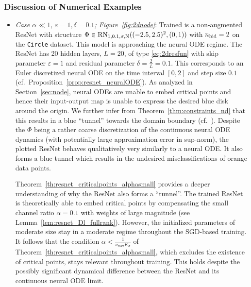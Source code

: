 \documentclass[10pt]{article}
\theoremstyle{definition}
\numberwithin{equation}{section}
\newcommand{\eps}{\varepsilon}
\newcommand*{\nhid}{n_\textup{hid}}
\begin{document}
\subsubsection{Discussion of Numerical Examples}
\begin{itemize}
    \item \emph{Case $\alpha \ll 1$, $\eps = 1, \delta = 0.1$; Figure~\ref{fig:2dnode}}: Trained is a non-augmented ResNet with structure $\Phi \in \textup{RN}_{1,0.1,\sigma, \textup{N}}((-2.5,2.5)^2, (0,1))$ with $\nhid = 2$ on the \texttt{Circle} dataset. This model is approaching the neural ODE regime. The ResNet has 20 hidden layers, $L = 20$, of type \eqref{eq:2dresfun} with skip parameter $\eps = 1$ and residual parameter $\delta = \frac2L = 0.1$. This corresponds to an Euler discretized neural ODE on the time interval $[0,2]$ and step size $0.1$ (cf.~Proposition~\ref{prop:resnet_neuralODE}). As analyzed in Section~\ref{sec:node}, neural ODEs are unable to embed critical points and hence their input-output map is unable to express the desired blue disk around the origin. We further infer from Theorem~\ref{thm:constraints_nd} that this results in a blue ``tunnel'' towards the domain boundary (cf.~\cite{Dupont2019}).  Despite the $\Phi$ being a rather coarse discretization of the continuous neural ODE dynamics (with potentially large approximation error in sup-norm), the plotted ResNet behaves qualitatively very similarly to a neural ODE. It also forms a blue tunnel which results in the undesired misclassifications of orange data points.

    Theorem~\ref{th:resnet_criticalpoints_alphasmall} provides a deeper understanding of why the ResNet also forms a ``tunnel''. The trained ResNet is theoretically able to embed critical points by compensating the small channel ratio $\alpha = 0.1$ with weights of large magnitude (see Lemma~\ref{lem:resnet_Dl_fullrank}). However, the initialized parameters of moderate size stay in a moderate regime throughout the SGD-based training.  It follows that the condition $\alpha < \frac{1}{\nu_{\max} K_\sigma}$ of Theorem~\ref{th:resnet_criticalpoints_alphasmall}, which excludes the existence of critical points, stays relevant throughout training. This holds despite the possibly significant dynamical difference between the ResNet and its continuous neural ODE limit.


\end{itemize}
\end{document}
